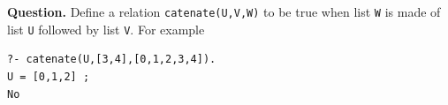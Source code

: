 \noindent\textbf{Question.} Define a relation
    \texttt{catenate(U,V,W)} to be true when list \texttt{W} is made
    of list \texttt{U} followed by list \texttt{V}. For example
{\small
\begin{verbatim}
?- catenate(U,[3,4],[0,1,2,3,4]).
U = [0,1,2] ;
No
\end{verbatim}
}
